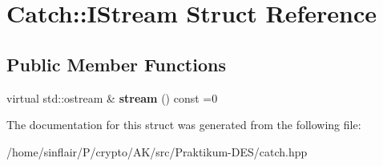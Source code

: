 \hypertarget{structCatch_1_1IStream}{}\section{Catch\+:\+:I\+Stream Struct Reference}
\label{structCatch_1_1IStream}
\subsection*{Public Member Functions}
\begin{DoxyCompactItemize}
\item 
\mbox{\label{structCatch_1_1IStream_a55a9ddbe250261ff38642f480ebdd902}} 
virtual std\+::ostream \& {\bfseries stream} () const =0
\end{DoxyCompactItemize}


The documentation for this struct was generated from the following file\+:\begin{DoxyCompactItemize}
\item 
/home/sinflair/\+P/crypto/\+A\+K/src/\+Praktikum-\/\+D\+E\+S/catch.\+hpp\end{DoxyCompactItemize}
